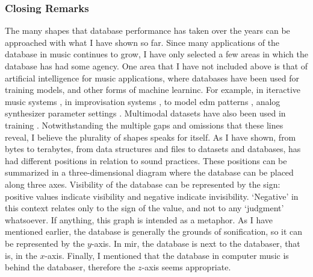 \subsubsection{Closing Remarks}
The many shapes that database performance has taken over the years can be approached with what I have shown so far. Since many applications of the database in music continues to grow, I have only selected a few areas in which the database has had some agency. One area that I have not included above is that of artificial intelligence for music applications, where databases have been used for training models, and other forms of machine learninc. For example, in iteractive music systems \parencite{Row92:Int}, in improvisation systems \parencites{DBLP:conf/icmc/AssayagDD99}{DBLP:conf/icmc/BlochD08}, to model \gls{edm} patterns \parencite{rvogl:2017}, analog synthesizer parameter settings \parencite{Loviscach2008}. Multimodal datasets have also been used in training \parencite{DBLP:conf/icmc/SchonerCDG98}. Notwithstanding the multiple gaps and omissions that these lines reveal, I believe the plurality of shapes speaks for itself. As I have shown, from bytes to terabytes, from data structures and files to datasets and databases, has had different positions in relation to sound practices. These positions can be summarized in a three-dimensional diagram  where the database can be placed along three axes. Visibility of the database can be represented by the sign: positive values indicate visibility and negative indicate invisibility. `Negative' in this context relates only to the sign of the value, and not to any `judgment' whatsoever. If anything, this graph is intended as a metaphor. As I have mentioned earlier, the database is generally the grounds of sonification, so it can be represented by the $y$-axis. In \gls{mir}, the database is next to the databaser, that is, in the $x$-axis. Finally, I mentioned that the database in computer music is behind the databaser, therefore the $z$-axis seems appropriate.


